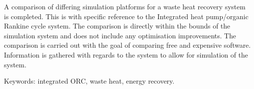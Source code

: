 A comparison of differing simulation platforms for a waste heat recovery system is completed. This is with specific reference to the Integrated heat pump/organic Rankine cycle system. The comparison is directly within the bounds of the simulation system and does not include any optimisation improvements. The comparison is carried out with the goal of comparing free and expensive software. Information is gathered with regards to the system to allow for simulation of the system.

Keywords: integrated ORC, waste heat, energy recovery.